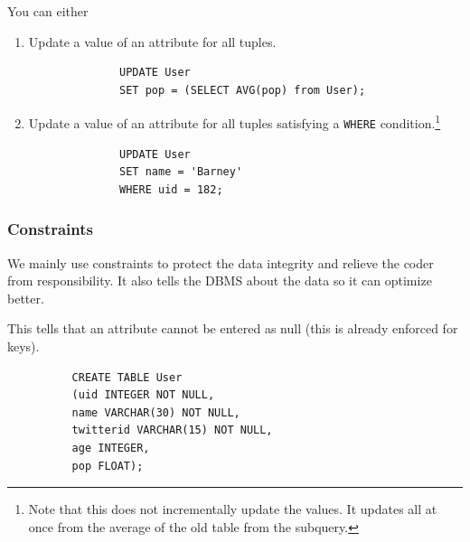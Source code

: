\documentclass{article}
\begin{document}
      \begin{definition}
        You can either 
        \begin{enumerate}
          \item Update a value of an attribute for all tuples. 
            \begin{lstlisting}
              UPDATE User 
              SET pop = (SELECT AVG(pop) from User); 
            \end{lstlisting}

          \item Update a value of an attribute for all tuples satisfying a \texttt{WHERE} condition.\footnote{Note that this does not incrementally update the values. It updates all at once from the average of the old table from the subquery.}
            \begin{lstlisting}
              UPDATE User 
              SET name = 'Barney' 
              WHERE uid = 182; 
            \end{lstlisting}
        \end{enumerate}
      \end{definition}

    \subsubsection{Constraints}

      We mainly use constraints to protect the data integrity and relieve the coder from responsibility. It also tells the DBMS about the data so it can optimize better. 

      \begin{definition}
        This tells that an attribute cannot be entered as null (this is already enforced for keys). 
        \begin{lstlisting}
          CREATE TABLE User 
          (uid INTEGER NOT NULL, 
          name VARCHAR(30) NOT NULL, 
          twitterid VARCHAR(15) NOT NULL, 
          age INTEGER, 
          pop FLOAT); 
        \end{lstlisting}
      \end{definition}
\end{document}
